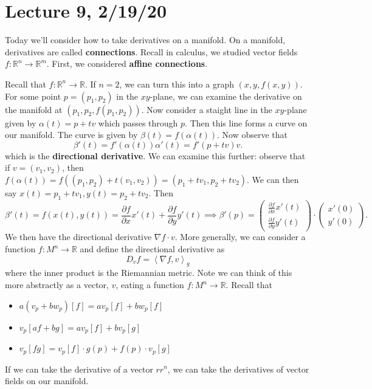 \documentclass[12pt,letterpaper,boxed]{maths_v5}
\newcommand{\rr}{\mathbb{R}}
\theoremstyle{definition}
\begin{document}
\section*{Lecture 9, 2/19/20}

Today we'll consider how to take derivatives on a manifold. On a manifold, derivatives 
are called \textbf{connections}. Recall in calculus, we studied vector fields $f: \rr^n \to \rr^m$. 
First, we considered \textbf{affine connections}.

Recall that $f: \rr^n \to \rr$. If $n = 2$, we can turn this into a
graph $(x, y, f(x, y))$. For some point $p = (p_1, p_2)$ in the $xy$-plane, we can examine the 
derivative on the manifold at $(p_1, p_2, f(p_1, p_2))$. Now consider a staight line in the $xy$-plane 
given by $\alpha(t)= p + tv$ which passes through $p$. Then this line forms a curve on our manifold. 
The curve is given by $\beta(t) = f(\alpha(t))$. Now observe that 
\[
    \beta'(t) = f'(\alpha(t))\alpha'(t) = f'(p + tv)v. 
\]
which is the \textbf{directional derivative}. We can examine this further:
observe that if $v = (v_1, v_2)$, then
$f(\alpha(t)) = f((p_1, p_2) + t(v_1, v_2)) = (p_1 + tv_1, p_2 + tv_2)$. 
We can then say $x(t) = p_1 + tv_1, y(t)=  p_2 + tv_2$. Then 
\[
    \beta'(t) = f(x(t), y(t)) = \frac{\partial f}{\partial x}x'(t) + \frac{\partial f}{\partial y}y'(t)
    \implies 
    \beta'(p) = 
    \begin{pmatrix}
        \frac{\partial f}{\partial x}x'(t)\\
        \frac{\partial f}{\partial y}y'(t)
    \end{pmatrix}
    \cdot 
    \begin{pmatrix}
        x'(0)\\
        y'(0)
    \end{pmatrix}.
\]
We then have the directional derivative $\nabla f \cdot v$. More generally, 
we can consider a function $f: M^n \to \rr$ and define the directional derivative as 
\[
    D_vf = \left< \nabla f, v \right>_g
\]
where the inner product is the Riemannian metric. Note we can think of this more 
abstractly as a vector, $v$, eating a function $f: M^n \to \rr$. 
Recall that 
\begin{itemize}
    \item $a(v_p + bw_p)[f] =  av_p[f] + bw_p[f]$
    \item $v_p[af + bg] = av_p[f] + bv_p[g]$
    \item $v_p[fg] = v_p[f]\cdot g(p) +f(p)\cdot v_p[g]$
\end{itemize}
If we can take the derivative of a vector $rr^n$, we can take the derivatives of vector 
fields on our manifold. 
\end{document}

